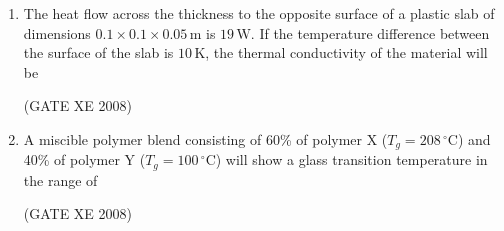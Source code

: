 \documentclass[12pt]{article}
\begin{document}
\begin{enumerate}
\begin{enumerate}
\end{enumerate}

(GATE XE 2008)

\item The heat flow across the thickness to the opposite surface of a plastic slab of dimensions $0.1 \times 0.1 \times 0.05 \, \text{m}$ is $19 \, \text{W}$. If the temperature difference between the surface of the slab is $10 \, \text{K}$, the thermal conductivity of the material will be

\begin{enumerate}
\end{enumerate}

(GATE XE 2008)

\item A miscible polymer blend consisting of 60\% of polymer X ($T_g = 208 \, ^\circ\text{C}$) and 40\% of polymer Y ($T_g = 100 \, ^\circ\text{C}$) will show a glass transition temperature in the range of

\begin{enumerate}
\end{enumerate}

(GATE XE 2008)


\end{enumerate}
\end{document}
